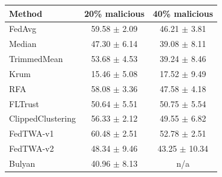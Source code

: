 \begin{tabular}{lcc}
\toprule
Method & 20\% malicious & 40\% malicious \\
\midrule
FedAvg & 59.58 $\pm$ 2.09 & 46.21 $\pm$ 3.81 \\
Median & 47.30 $\pm$ 6.14 & 39.08 $\pm$ 8.11 \\
TrimmedMean & 53.68 $\pm$ 4.53 & 39.24 $\pm$ 8.46 \\
Krum & 15.46 $\pm$ 5.08 & 17.52 $\pm$ 9.49 \\
RFA & 58.08 $\pm$ 3.36 & 47.58 $\pm$ 4.18 \\
FLTrust & 50.64 $\pm$ 5.51 & 50.75 $\pm$ 5.54 \\
ClippedClustering & 56.33 $\pm$ 2.12 & 49.55 $\pm$ 6.82 \\
FedTWA-v1 & 60.48 $\pm$ 2.51 & 52.78 $\pm$ 2.51 \\
FedTWA-v2 & 48.34 $\pm$ 9.46 & 43.25 $\pm$ 10.34 \\
Bulyan & 40.96 $\pm$ 8.13 & n/a \\
\bottomrule
\end{tabular}